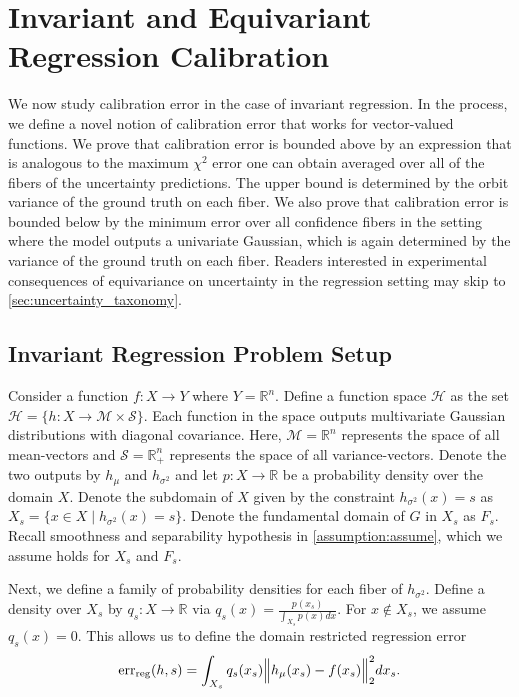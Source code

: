 \documentclass[10pt]{article} %
\theoremstyle{definition}
\begin{document}
\section{Invariant and Equivariant Regression Calibration} \label{sec:invariant_regression_bound}

We now study calibration error in the case of invariant regression. In the process, we define a novel notion of calibration error that works for vector-valued functions. We prove that calibration error is bounded above by an expression that is analogous to the maximum $\chi^2$ error one can obtain averaged over all of the fibers of the uncertainty predictions. The upper bound is determined by the orbit variance of the ground truth on each fiber. We also prove that calibration error is bounded below by the minimum error over all confidence fibers in the setting where the model outputs a univariate Gaussian, which is again determined by the variance of the ground truth on each fiber. Readers interested in experimental consequences of equivariance on uncertainty in the regression setting may skip to \cref{sec:uncertainty_taxonomy}.

\subsection{Invariant Regression Problem Setup} 
Consider a function $f: X \to Y$ where $Y = \mathbb{R}^n$. Define a function space $\mathscr{H}$ as the set $\mathscr{H} = \{h\colon X \to \mathcal{M} \times \mathcal{S}\}$. Each function in the space outputs multivariate Gaussian distributions with diagonal covariance. Here, $\mathcal{M} = \mathbb{R}^n$ represents the space of all mean-vectors and  $\mathcal{S} = \mathbb{R}_+^n$ represents the space of all variance-vectors. Denote the two outputs by $h_\mu$ and $h_{\sigma^2}$ and let $p \colon X \to \mathbb{R}$ be a probability density over the domain $X$. Denote the subdomain of $X$ given by the constraint $h_{\sigma^2}(x) = s$ as $X_s = \{x \in X \mid{h_{\sigma^2}(x) = s}\}$. Denote the fundamental domain of $G$ in $X_s$ as $F_s$. Recall smoothness and separability hypothesis in \cref{assumption:assume}, which we assume holds for $X_s$ and $F_s$.

Next, we define a family of probability densities for each fiber of $h_{\sigma^2}$. Define a density over $X_s$ by $q_s \colon X \to \mathbb{R}$ via $q_s(x) = \frac{p(x_s)}{\int_{X_s}p(x)dx}$. For $x \notin X_s$, we assume $q_s(x) = 0$. This allows us to define the domain restricted regression error
\begin{equation}
\text{err}_{\text{reg}}(h, s) = \int_{X_s}q_s(x_s) \Bigl\lVert h_{\mu}(x_s) - f(x_s) \Bigr\rVert _2^2dx_s \label{eq:domain_restrict_reg}.
\end{equation}
\end{document}
